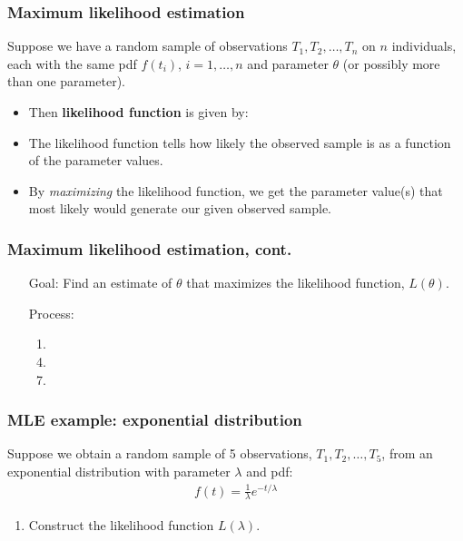 \begin{frame}
\frametitle{Maximum likelihood estimation}
Suppose we have a random sample of observations $T_1, T_2, \ldots, T_n$ on $n$ individuals, each with the same pdf $f(t_i)$, $i=1, \ldots, n$ and parameter $\theta$ (or possibly more than one parameter).
\begin{itemize}
\item Then \textbf{likelihood function} is given by:
\item[]
\item[]
\item[]
\item[]
\item The likelihood function tells how likely the observed sample is as a function of the parameter values.

\item By \textit{maximizing} the likelihood function, we get the parameter value(s) that most likely would generate our given observed sample.
\end{itemize}
\end{frame}

\begin{frame}
\frametitle{Maximum likelihood estimation, cont.}
\begin{itemize}
\item[Goal:] Find an estimate of $\theta$ that maximizes the likelihood function, $L(\theta)$.
\item[]
\item[Process:]
\begin{enumerate}
\item %
\item[]
\item[]
\item %
\item[]
\item[]
\item %
\item[]
\item[]
\end{enumerate}
\end{itemize}
\end{frame}

\begin{frame}
\frametitle{MLE example: exponential distribution}
Suppose we obtain a random sample of 5 observations, $T_1,T_2,\ldots,T_5$, from an exponential distribution with
parameter $\lambda$ and pdf:
\begin{eqnarray}
f(t) = \frac{1}{\lambda} e^{-t/\lambda} \nonumber
\end{eqnarray}
\begin{enumerate}
\item Construct the likelihood function $L(\lambda)$.
\vskip150pt
\end{enumerate}
\end{frame}

